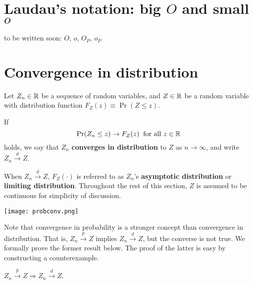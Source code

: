 \documentclass[11pt, A4paper, openany, uplatex]{book}
\begin{document}
\section{Laudau's notation: big $O$ and small $o$}

to be written soon: $O$, $o$, $O_P$, $o_P$

\section{Convergence in distribution}\label{subsec:indist}

Let $Z_n \in \mathbb{R}$ be a  sequence of random variables, and $Z \in \mathbb{R}$ be a random variable with distribution function  $F_Z(z) \equiv \Pr(Z \le z)$.
\begin{definition}
If
\[
	\Pr(Z_n \le z) \to F_Z(z) \;\; \text{for all $z \in \mathbb{R}$}
\]
holds, we say that $Z_n$ \textbf{converges in distribution} to $Z$ as $n \to \infty$, and write $Z_n \overset{d}{\to} Z$.
\end{definition}
When $Z_n \overset{d}{\to} Z$, $F_Z(\cdot)$ is referred to as $Z_n$'s \textbf{asymptotic distribution} or \textbf{limiting distribution}.
Throughout the rest of this section, $Z$ is assumed to be continuous for simplicity of discussion.

\begin{center}
		\texttt{[image: probconv.png]}
\end{center}


Note that convergence in probability is a stronger concept than convergence in distribution.
That is, $Z_n \overset{p}{\to} Z$ implies $Z_n \overset{d}{\to} Z$, but the converse is not true.
We formally prove the former result below.
The proof of the latter is easy by constructing a counterexample.
\begin{lemma}\label{lem:p_to_d}
	$Z_n \overset{p}{\to} Z \Longrightarrow Z_n \overset{d}{\to} Z$.
\end{lemma}
\end{document}
